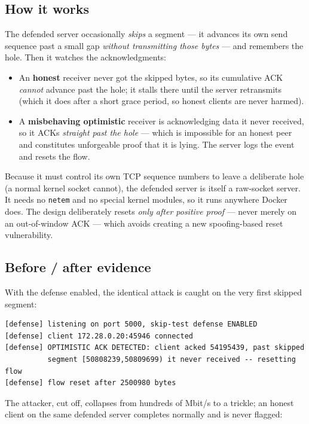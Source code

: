 \documentclass[11pt,a4paper]{article}
\begin{document}
\subsection{How it works}
The defended server occasionally \emph{skips} a segment --- it advances its own send
sequence past a small gap \emph{without transmitting those bytes} --- and remembers the
hole. Then it watches the acknowledgments:

\begin{itemize}
  \item An \textbf{honest} receiver never got the skipped bytes, so its cumulative ACK
        \emph{cannot} advance past the hole; it stalls there until the server retransmits
        (which it does after a short grace period, so honest clients are never harmed).
  \item A \textbf{misbehaving optimistic} receiver is acknowledging data it never
        received, so it ACKs \emph{straight past the hole} --- which is impossible for an
        honest peer and constitutes unforgeable proof that it is lying. The server logs
        the event and resets the flow.
\end{itemize}

Because it must control its own TCP sequence numbers to leave a deliberate hole (a normal
kernel socket cannot), the defended server is itself a raw-socket server. It needs no
\texttt{netem} and no special kernel modules, so it runs anywhere Docker does. The design
deliberately resets \emph{only after positive proof} --- never merely on an out-of-window
ACK --- which avoids creating a new spoofing-based reset vulnerability.

\subsection{Before / after evidence}
With the defense enabled, the identical attack is caught on the very first skipped segment:
\begin{lstlisting}[style=term]
[defense] listening on port 5000, skip-test defense ENABLED
[defense] client 172.28.0.20:45946 connected
[defense] OPTIMISTIC ACK DETECTED: client acked 54195439, past skipped
          segment [50808239,50809699) it never received -- resetting flow
[defense] flow reset after 2500980 bytes
\end{lstlisting}

The attacker, cut off, collapses from hundreds of Mbit/s to a trickle; an honest client
on the same defended server completes normally and is never flagged:
\end{document}
